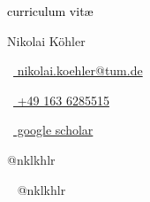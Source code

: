 \begin{scriptsize}
	 \textcolor{black}{curriculum vit\ae}
\end{scriptsize}

\vspace*{-0.10em}
\begin{Large}
	Nikolai K\"ohler
\end{Large}

\vspace*{0.25em}
%
\vspace*{0.4cm}

\begin{footnotesize}
	\quad
	\begin{tiny}\faEnvelope[regular]\end{tiny}~\href{mailto:nikolai.koehler@tum.de}{%
		nikolai.koehler@tum.de
	}
	\quad
	\begin{tiny}\faMobile*\end{tiny}~\href{tel:+491636285515}{
		+49 163 6285515
	}

	\begin{tiny}\faGraduationCap\end{tiny}~\href{https://scholar.google.com/citations?user=USERID&hl=en}{
		 google scholar
		}
	\quad
	\begin{tiny}\faTwitter\end{tiny}{
		@nklkhlr
	}
	\quad
	\begin{tiny}\faGithub\end{tiny}~{
		@nklkhlr
	}

\end{footnotesize}
